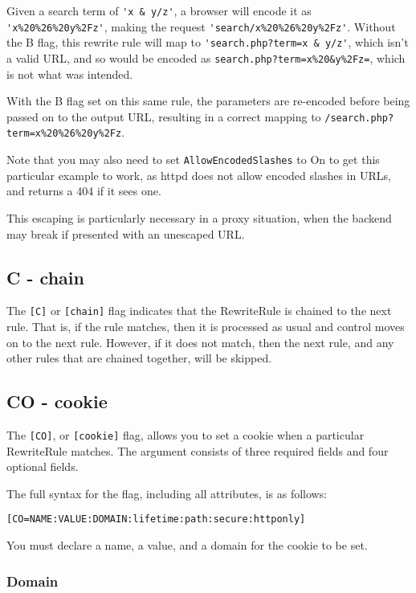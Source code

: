 Given a search term of \verb~'x & y/z'~, a browser will encode it as \verb~'x%20%26%20y%2Fz'~, making the request \verb~'search/x%20%26%20y%2Fz'~. Without the B flag, this rewrite rule will map to \verb~'search.php?term=x & y/z'~, which isn't a valid URL, and so would be encoded as \verb~search.php?term=x%20&y%2Fz=~, which is not what was intended.

With the B flag set on this same rule, the parameters are re-encoded before being passed on to the output URL, resulting in a correct mapping to \verb~/search.php?term=x%20%26%20y%2Fz~.

Note that you may also need to set \verb~AllowEncodedSlashes~ to On to get this particular example to work, as httpd does not allow encoded slashes in URLs, and returns a 404 if it sees one.

This escaping is particularly necessary in a proxy situation, when the backend may break if presented with an unescaped URL.

\subsection{C - chain}
\label{cflag}

The \verb~[C]~ or \verb~[chain]~ flag indicates that the RewriteRule is chained to the next rule. That is, if the rule matches, then it is processed as usual and control moves on to the next rule. However, if it does not match, then the next rule, and any other rules that are chained together, will be skipped.

\subsection{CO - cookie}
\label{coflag}

The \verb~[CO]~, or \verb~[cookie]~ flag, allows you to set a cookie when a particular RewriteRule matches. The argument consists of three required fields and four optional fields.

The full syntax for the flag, including all attributes, is as follows:

\begin{verbatim}
[CO=NAME:VALUE:DOMAIN:lifetime:path:secure:httponly]
\end{verbatim}

You must declare a name, a value, and a domain for the cookie to be set.

\subsubsection{Domain}

